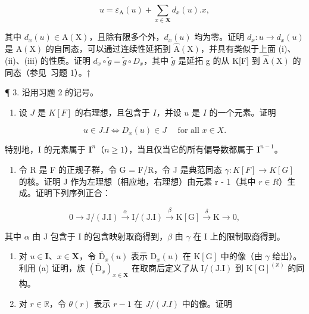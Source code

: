 \[
u = \varepsilon_ {\mathrm{A}} (u) + \sum_ {x \in \mathbf {X}} d _ {x} (u). x,
\]

其中 \(d_{x}(u) \in \mathrm{A}(\mathrm{X})\)，且除有限多个外，\(d_{x}(u)\) 均为零。证明 \(d_{x}: u \to d_{x}(u)\) 是 \(\mathrm{A}(\mathrm{X})\) 的自同态，可以通过连续性延拓到 \(\hat{\mathrm{A}}(\mathrm{X})\)，并具有类似于上面 (i)、(ii)、(iii) 的性质。证明 \(d_{x} \circ \tilde{g} = \tilde{g} \circ D_{x}\)，其中 \(\tilde{g}\) 是延拓 g 的从 K{[}F{]} 到 \(\hat{\mathrm{A}}(\mathrm{X})\) 的同态（参见~习题 1）。†

¶ 3. 沿用习题 2 的记号。

\begin{enumerate}
\def\labelenumi{(\alph{enumi})}
\tightlist
\item
  设 \(J\) 是 \(K[F]\) 的右理想，且包含于 \(I\)，并设 \(u\) 是 \(I\) 的一个元素。证明
\end{enumerate}

\[
u \in J. I \Leftrightarrow D _ {x} (u) \in J \quad \text { for   all } x \in X.
\]

特别地，I 的元素属于 \(\mathbf{I}^n\)（\(n \geqslant 1\)），当且仅当它的所有偏导数都属于 \(\mathbf{I}^{n-1}\)。


\begin{enumerate}
\def\labelenumi{(\alph{enumi})}
\setcounter{enumi}{1}
\tightlist
\item
  令 R 是 F 的正规子群，令 G = F/R，令 J 是典范同态 \(\gamma: K[F] \to K[G]\) 的核。证明 J 作为左理想（相应地，右理想）由元素 r - 1（其中 \(r \in R\)）生成。证明下列序列正合：
\end{enumerate}

\[
0 \longrightarrow \mathrm{J} / (\mathrm{J}. \mathrm{I}) \stackrel {\alpha} {\longrightarrow} \mathrm{I} / (\mathrm{J}. \mathrm{I}) \stackrel {\beta} {\longrightarrow} \mathrm{K} [ \mathrm{G} ] \stackrel {\delta} {\longrightarrow} \mathrm{K} \longrightarrow 0,\tag{*}
\]

其中 \(\alpha\) 由 J 包含于 I 的包含映射取商得到，\(\beta\) 由 \(\gamma\) 在 I 上的限制取商得到。

\begin{enumerate}
\def\labelenumi{(\alph{enumi})}
\setcounter{enumi}{2}
\item
  对 \(u \in \mathbf{I}\)、\(x \in \mathbf{X}\)，令 \(\overline{\mathrm{D}}_x(u)\) 表示 \(\mathrm{D}_x(u)\) 在 \(\mathrm{K}[\mathrm{G}]\) 中的像（由 \(\gamma\) 给出）。利用 (a) 证明，族 \((\overline{\mathrm{D}}_x)_{x \in \mathbf{X}}\) 在取商后定义了从 \(\mathrm{I} / (\mathrm{J}. \mathrm{I})\) 到 \(\mathrm{K}[\mathrm{G}]^{(\mathbb{X})}\) 的同构。
\item
  对 \(r \in \mathbb{R}\)，令 \(\theta(r)\) 表示 \(r - 1\) 在 \(J/(J.I)\) 中的像。证明
\end{enumerate}

